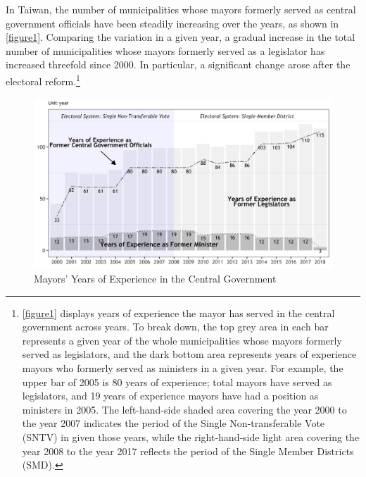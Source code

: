 In Taiwan, the number of municipalities whose mayors formerly served as central government officials have been steadily increasing over the years, as shown in \autoref{figure1}. Comparing the variation in a given year, a gradual increase in the total number of municipalities whose mayors formerly served as a legislator has increased threefold since 2000. In particular, a significant change arose after the electoral reform.\footnote{\autoref{figure1} displays years of experience the mayor has served in the central government across years. To break down, the top grey area in each bar represents a given year of the whole municipalities whose mayors formerly served as legislators, and the dark bottom area represents years of experience mayors who formerly served as ministers in a given year. For example, the upper bar of 2005 is 80 years of experience; total mayors have served as legislators, and 19 years of experience mayors have had a position as ministers in 2005. The left-hand-side shaded area covering the year 2000 to the year 2007 indicates the period of the Single Non-transferable Vote (SNTV) in given those years, while the right-hand-side light area covering the year 2008 to the year 2017 reflects the period of the Single Member Districts (SMD).}

\begin{figure}[ht]
\begin{centering}
\caption{Mayors' Years of Experience in the Central Government\label{figure1}}
\par\end{centering}
\centering{}\includegraphics[scale=0.18]{04-Chapter-Four/image/figure1.jpeg}
\end{figure}

